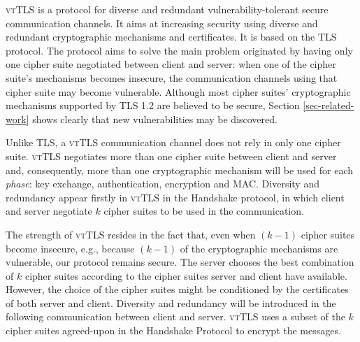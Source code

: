 \documentclass{sig-alternate-05-2015}
\begin{document}
\textsc{vtTLS} is a protocol for diverse and redundant vulnerabi\-li\-ty-tolerant secure communication channels. It aims at increasing security using diverse and redundant cryptographic mechanisms and certificates. It is based on the TLS protocol. %
The protocol aims to solve the main problem originated by having only one cipher suite negotiated between client and server: when one of the cipher suite's mechanisms becomes insecure, the communication channels using that cipher suite may become vulnerable.
Although most cipher suites' cryptographic mechanisms supported by TLS 1.2 are believed to be secure, Section \ref{sec-related-work} shows clearly that new vulnerabilities may be discovered. 

Unlike TLS, a \textsc{vtTLS} communication channel does not rely in only one cipher suite. \textsc{vtTLS} negotiates more than one cipher suite between client and server and, consequently, more than one cryptographic mechanism will be used for each \emph{phase}: key exchange, authentication, encryption and MAC.
%
Diversity and redundancy appear firstly in \textsc{vtTLS} in the Handshake protocol, in which client and server negotiate $k$ cipher suites to be used in the communication.

The strength of \textsc{vtTLS} resides in the fact that, even when $(k - 1)$ cipher suites become insecure, e.g., because $(k-1)$ of the  cryptographic mechanisms are vulnerable, our protocol remains secure. %
The server chooses the best combination of $k$ cipher suites according to the cipher suites server and client have available. However, the choice of the cipher suites might be conditioned by the certificates of both server and client.
Diversity and redundancy will  be introduced in the following communication between client and server. \textsc{vtTLS} uses a subset of the $k$ cipher suites agreed-upon in the Handshake Protocol to encrypt the messages.
\end{document}
